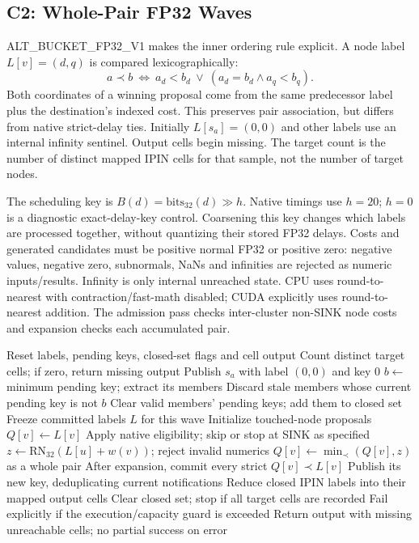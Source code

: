 \subsection{C2: Whole-Pair FP32 Waves}
ALT\_BUCKET\_FP32\_V1 makes the inner ordering rule explicit. A node label $L[v]=(d,q)$ is compared lexicographically:
\begin{equation}
 a\prec b\ \Longleftrightarrow\ a_d<b_d\ \lor\ (a_d=b_d\land a_q<b_q).
\end{equation}
Both coordinates of a winning proposal come from the same predecessor label plus the destination's indexed cost. This preserves pair association, but differs from native strict-delay ties. Initially $L[s_a]=(0,0)$ and other labels use an internal infinity sentinel. Output cells begin missing. The target count is the number of distinct mapped IPIN cells for that sample, not the number of target nodes.

The scheduling key is $B(d)=\mathrm{bits}_{32}(d)\gg h$. Native timings use $h=20$; $h=0$ is a diagnostic exact-delay-key control. Coarsening this key changes which labels are processed together, without quantizing their stored FP32 delays. Costs and generated candidates must be positive normal FP32 or positive zero: negative values, negative zero, subnormals, NaNs and infinities are rejected as numeric inputs/results. Infinity is only internal unreached state. CPU uses round-to-nearest with contraction/fast-math disabled; CUDA explicitly uses round-to-nearest addition. The admission pass checks inter-cluster non-SINK node costs and expansion checks each accumulated pair.

\begin{algorithm}[t]
\caption{C2: one logical ALT sample (native wave rule)}\label{alg:c2}
\begin{algorithmic}[1]
\State Reset labels, pending keys, closed-set flags and cell output
\State Count distinct target cells; if zero, return missing output
\State Publish $s_a$ with label $(0,0)$ and key 0
\State $b\gets$ minimum pending key; extract its members
\State Discard stale members whose current pending key is not $b$
\State Clear valid members' pending keys; add them to closed set
\State Freeze committed labels $L$ for this wave
\State Initialize touched-node proposals $Q[v]\gets L[v]$
\State Apply native eligibility; skip or stop at SINK as specified
\State $z\gets\mathrm{RN}_{32}(L[u]+w(v))$; reject invalid numerics
\State $Q[v]\gets\min_{\prec}(Q[v],z)$ as a whole pair
\EndFor
\State After expansion, commit every strict $Q[v]\prec L[v]$
\State Publish its new key, deduplicating current notifications
\State Reduce closed IPIN labels into their mapped output cells
\State Clear closed set; stop if all target cells are recorded
\EndIf
\State Fail explicitly if the execution/capacity guard is exceeded
\EndWhile
\State Return output with missing unreachable cells; no partial success on error
\end{algorithmic}
\end{algorithm}

